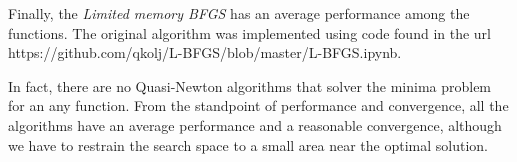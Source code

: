 \documentclass[conference]{IEEEtran}
\begin{document}
Finally, the \textit{Limited memory BFGS} has an average performance among the functions. The original algorithm was implemented using code found in the url https://github.com/qkolj/L-BFGS/blob/master/L-BFGS.ipynb.

In fact, there are no Quasi-Newton algorithms that solver the minima problem for an any function. From the standpoint of performance and convergence, all the algorithms have an average performance and a reasonable convergence, although we have to restrain the search space to a small area near the optimal solution.
\end{document}
